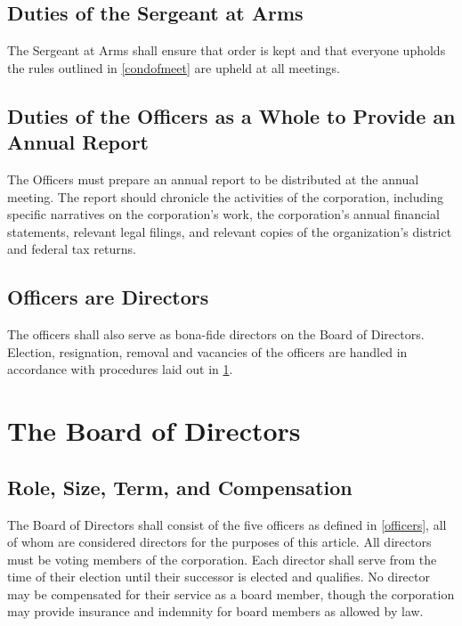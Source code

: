 \documentclass[10pt,letterpaper,titlepage]{article}
\begin{document}
\subsection{Duties of the Sergeant at Arms}

The Sergeant at Arms shall ensure that order is kept and that everyone upholds
the rules outlined in \ref{condofmeet} are upheld at all meetings.

\subsection{Duties of the Officers as a Whole to Provide an Annual Report}

The Officers must prepare an annual report to be distributed at the annual
meeting.
The report should chronicle the activities of the corporation, including
specific narratives on the corporation's work, the corporation's annual
financial statements, relevant legal filings, and relevant copies of the
organization's district and federal tax returns.

\subsection{Officers are Directors}

The officers shall also serve as bona-fide directors on the Board of Directors.
Election, resignation, removal and vacancies of the officers are handled in
accordance with procedures laid out in \ref{boardofdirect}.

\section{The Board of Directors}
\label{boardofdirect}

\subsection{Role, Size, Term, and Compensation}

The Board of Directors shall consist of the five officers as defined in
\ref{officers}, all of whom are considered directors for the purposes of this
article.
All directors must be voting members of the corporation.
Each director shall serve from the time of their election until their successor
is elected and qualifies.
No director may be compensated for their service as a board member, though the
corporation may provide insurance and indemnity for board members as allowed by
law.
\end{document}
